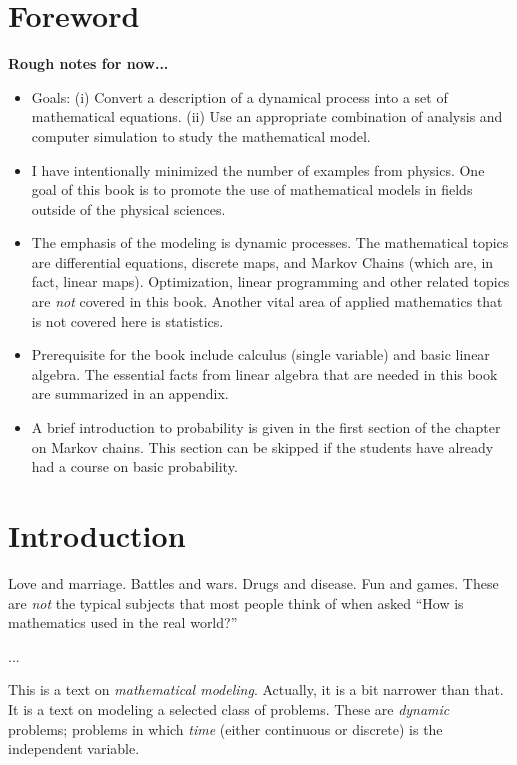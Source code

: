 \documentclass[reqno]{immbook}
\title{\fbox{\fbox{\fbox{\texttt{[image: fig/IMMtitle.eps]}}}}}
\author{Warren Weckesser\\
Department of Mathematics\\
Colgate University\\
\vspace{0.5in}
\centerline{%
\texttt{[image: matlab/SIRscript.plot.eps]}%
\hspace{0.4in}%
\texttt{[image: matlab/LinPhPortExample1.eps]}%
}
\vspace{0.1in}
\centerline{%
\texttt{[image: matlab\_map1d/logisticmap\_timeseries.eps]}%
\hspace{0.4in}%
\texttt{[image: fig/trans\_diag.eps]}
}
\vspace{0.25in}
{\small Copyright \copyright ~2005, 2006 Warren Weckesser}}
\numberwithin{equation}{chapter}
\numberwithin{question}{section}
\numberwithin{theorem}{chapter}
\numberwithin{figure}{chapter}
\theoremstyle{definition}
\begin{document}
\frontmatter
\maketitle
\tableofcontents
%
%
%

\chapter*{Foreword}
\textbf{Rough notes for now...}
\begin{itemize}
\item Goals: (i) Convert a description of a dynamical process
into a set of mathematical equations.
(ii) Use an appropriate combination of analysis and computer
simulation to study the mathematical model.
\item  I have intentionally minimized the
number of examples from physics.
One goal of this book is
to promote the use of mathematical models in fields outside of the
physical sciences.
\item The emphasis of the modeling is dynamic processes.
The mathematical topics are differential equations, discrete maps,
and Markov Chains (which are, in fact, linear maps).
Optimization, linear programming and other related topics
are \emph{not} covered in this book.
Another vital area of applied mathematics that is not
covered here is statistics.
\item Prerequisite for the book include calculus (single variable)
and basic linear algebra.  The essential facts from linear algebra that
are needed in this book are summarized in an appendix.
\item A brief introduction to probability is given in the
first section of the chapter on Markov chains. This section
can be skipped if the students have already had a course
on basic probability.
\end{itemize}
%
\mainmatter
%
%
%

\chapter{Introduction}
%
Love and marriage.  Battles and wars.
Drugs and disease. Fun and games.
These are \emph{not} the typical subjects that most
people think of when asked ``How is mathematics used
in the real world?''

...

This is a text on \emph{mathematical modeling}.
Actually, it is a bit narrower than that.
It is a text on modeling a selected class of
problems.  These are \emph{dynamic} problems;
problems in which \emph{time} (either continuous
or discrete) is the independent variable.
\end{document}
